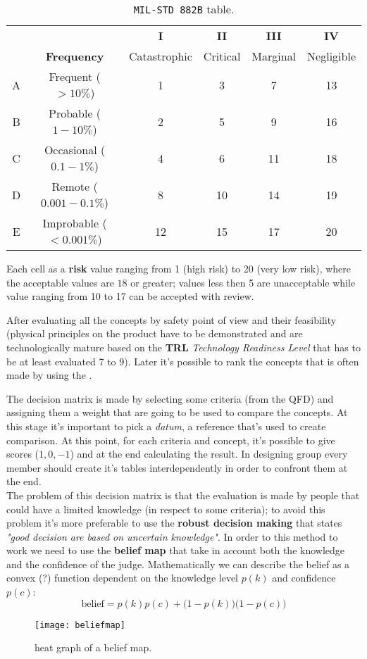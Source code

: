 		\begin{table}[bht]
		\centering
		\begin{tabular}{c c || c | c | c | c}
			& & \textbf{I} & \textbf{II} & \textbf{III} & \textbf{IV} \\
			& \textbf{Frequency} & Catastrophic & Critical & Marginal  & Negligible \\ \hline \hline
			A & Frequent ($>10\%$) & 1 & 3 & 7 & 13 \\
			B & Probable ($1-10\%$) & 2 & 5 & 9 & 16 \\
			C & Occasional ($0.1-1\%$) & 4 & 6 & 11 & 18 \\
			D & Remote ($0.001-0.1\%$) & 8 & 10 & 14 & 19 \\
			E & Improbable ($<0.001\%$) & 12 & 15 & 17 & 20 \\
		\end{tabular}
		\caption{\texttt{MIL-STD 882B} table.} \label{fig:des:milstd}
		\end{table}
				
		Each cell as a \textbf{risk} value ranging from 1 (high risk) to 20 (very low risk), where the acceptable values are $18$ or greater; values less then 5 are unacceptable while value ranging from 10 to 17 can be accepted with review.
		
		\vspace{3mm}
		
		After evaluating all the concepts by safety point of view and their feasibility (physical principles on the product have to be demonstrated and are technologically mature based on the \textbf{TRL} \textit{Technology Readiness Level} that has to be at least evaluated 7 to 9). Later it's possible to rank the concepts that is often made by using the .
		
		The decision matrix is made by selecting some criteria  (from the QFD) and assigning them a weight that are going to be used to compare the concepts. At this stage it's important to pick a \textit{datum}, a reference that's used to create comparison. At this point, for each criteria and concept, it's possible to give scores ($1,0,-1$) and at the end calculating the result. In designing group every member should create it's tables interdependently in order to confront them at the end.\\
		The problem of this decision matrix is that the evaluation is made by people that could have a limited knowledge (in respect to some criteria); to avoid this problem it's more preferable to use the \textbf{robust decision making} that states \textit{"good decision are based on uncertain knowledge"}. In order to this method to work we need to use the \textbf{belief map} that take in account both the knowledge and the confidence of the judge. Mathematically we can describe the belief as a convex (?) function dependent on the knowledge level $p(k)$ and confidence $p(c)$:
		\[ \textrm{belief} = p(k)p(c) + \big(1-p(k)\big)\big(1-p(c)\big) \]		
		\begin{SCfigure}[0.6][b]
			\centering
			\texttt{[image: beliefmap]}
			\caption{heat graph of a belief map.}
			\label{fig:des:beliefmap}
		\end{SCfigure}
		
